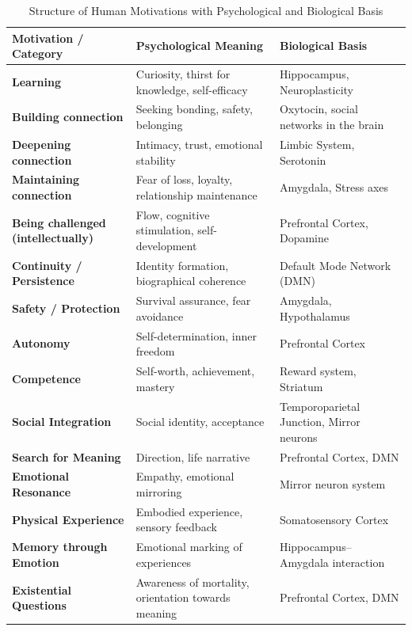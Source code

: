 \begin{table}[H]
    \renewcommand{\arraystretch}{1.5}
    \centering
    \begin{tabular}{L{4cm}|L{5cm}|L{5cm}}
        \textbf{Motivation / Category} & \textbf{Psychological Meaning} & \textbf{Biological Basis} \\
        \hline
        \textbf{Learning} & Curiosity, thirst for knowledge, self-efficacy & Hippocampus, Neuroplasticity \\
        \textbf{Building connection} & Seeking bonding, safety, belonging & Oxytocin, social networks in the brain \\
        \textbf{Deepening connection} & Intimacy, trust, emotional stability & Limbic System, Serotonin \\
        \textbf{Maintaining connection} & Fear of loss, loyalty, relationship maintenance & Amygdala, Stress axes \\
        \textbf{Being challenged (intellectually)} & Flow, cognitive stimulation, self-development & Prefrontal Cortex, Dopamine \\
        \textbf{Continuity / Persistence} & Identity formation, biographical coherence & Default Mode Network (DMN) \\
        \textbf{Safety / Protection} & Survival assurance, fear avoidance & Amygdala, Hypothalamus \\
        \textbf{Autonomy} & Self-determination, inner freedom & Prefrontal Cortex \\
        \textbf{Competence} & Self-worth, achievement, mastery & Reward system, Striatum \\
        \textbf{Social Integration} & Social identity, acceptance & Temporoparietal Junction, Mirror neurons \\
        \textbf{Search for Meaning} & Direction, life narrative & Prefrontal Cortex, DMN \\
        \textbf{Emotional Resonance} & Empathy, emotional mirroring & Mirror neuron system \\
        \textbf{Physical Experience} & Embodied experience, sensory feedback & Somatosensory Cortex \\
        \textbf{Memory through Emotion} & Emotional marking of experiences & Hippocampus–Amygdala interaction \\
        \textbf{Existential Questions} & Awareness of mortality, orientation towards meaning & Prefrontal Cortex, DMN \\
    \end{tabular}
    \caption{Structure of Human Motivations with Psychological and Biological Basis}
    \label{tab:menschliche_motive}
\end{table}

